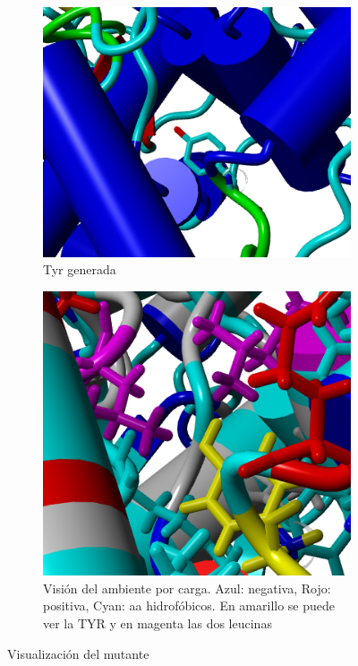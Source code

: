 \documentclass[a4paper,11pt]{report}
\begin{document}
 \begin{figure}[h!]
	\centering
	\begin{subfigure}{0.45\textwidth}
		\includegraphics[width=\linewidth]{Figuras/Figura30}
		\caption{Tyr generada}
	\end{subfigure}  	
	\begin{subfigure}{0.45\textwidth}
		\includegraphics[width=\linewidth]{Figuras/Figura32}
		\caption{Visión del ambiente por carga. Azul: negativa, Rojo: positiva, Cyan: aa hidrofóbicos. En amarillo se puede ver la TYR y en magenta las dos leucinas}
		\label{fig: mutcar}
	\end{subfigure}
	\caption{Visualización del mutante}	
\end{figure}
\end{document}
